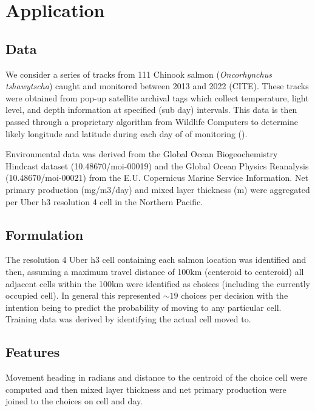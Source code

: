 \documentclass[11pt]{article}
\begin{document}
\section*{Application}

\subsection*{Data}

We consider a series of tracks from 111 Chinook salmon (\textit{Oncorhynchus tshawytscha}) caught and monitored between 2013 and 2022 (CITE). These tracks were obtained from pop-up satellite archival tags which collect temperature, light level, and depth information at specified (sub day) intervals. This data is then passed through a proprietary algorithm from Wildlife Computers to determine likely longitude and latitude during each day of of monitoring (\cite{PSAT}). \newline

Environmental data was derived from the Global Ocean Biogeochemistry Hindcast dataset (10.48670/moi-00019) and the Global Ocean Physics Reanalysis (10.48670/moi-00021) from the E.U. Copernicus Marine Service Information. Net primary production (mg/m3/day) and mixed layer thickness (m) were aggregated per Uber h3 resolution 4 cell in the Northern Pacific. 

\subsection*{Formulation}

The resolution 4 Uber h3 cell containing each salmon location was identified and then, assuming a maximum travel distance of 100km (centeroid to centeroid) all adjacent cells within the 100km were identified as choices (including the currently occupied cell). In general this represented $\sim 19$ choices per decision with the intention being to predict the probability of moving to any particular cell. Training data was derived by identifying the actual cell moved to. 

\subsection*{Features} 

Movement heading in radians and distance to the centroid of the choice cell were computed and then mixed layer thickness and net primary production were joined to the choices on cell and day.
\end{document}
